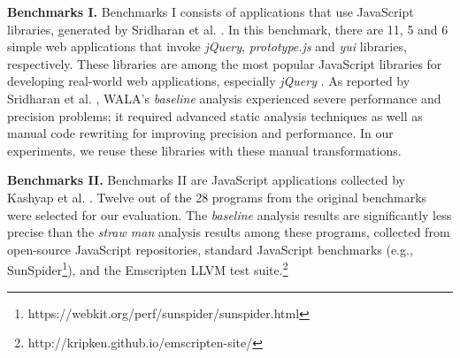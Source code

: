 

{\bf Benchmarks I.} Benchmarks I consists of applications that use JavaScript libraries, generated by Sridharan et al. \cite{Sridharan:2012:CTP:2367163.2367191}. In this benchmark, there are 11, 5 and 6 simple web applications that invoke {\it jQuery}, {\it prototype.js} and {\it yui} libraries, respectively. These libraries are among the most popular JavaScript libraries for developing real-world web applications, especially {\it jQuery} \cite{LibraryUsage}. As reported by Sridharan et al. \cite{Sridharan:2012:CTP:2367163.2367191}, WALA's {\it baseline} analysis experienced severe performance and precision problems; it required advanced static analysis techniques as well as manual code rewriting for improving precision and performance. In our experiments, we reuse these libraries with these manual transformations.

{\bf Benchmarks II.} Benchmarks II are JavaScript applications collected by Kashyap et al. \cite{Kashyap:2014:JSA:2635868.2635904}. Twelve out of the 28 programs from the original benchmarks were selected for our evaluation. The {\it baseline} analysis results are significantly less precise than the {\it straw man} analysis results among these programs, collected from open-source JavaScript repositories, standard JavaScript benchmarks (e.g., SunSpider\footnote{https://webkit.org/perf/sunspider/sunspider.html}), and the Emscripten LLVM test suite.\footnote{http://kripken.github.io/emscripten-site/}

